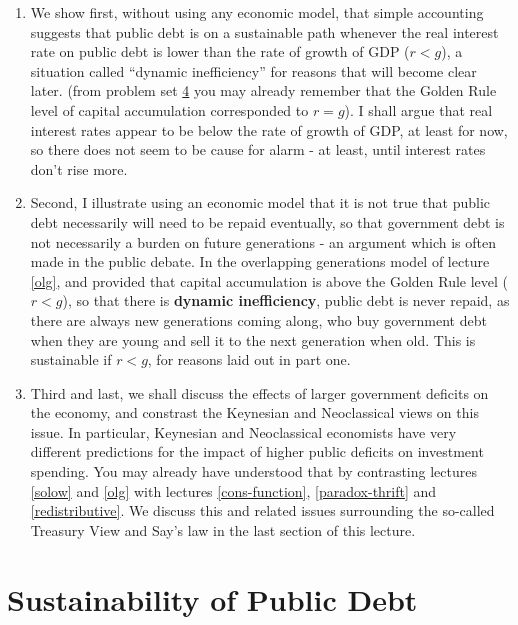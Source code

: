 \documentclass[]{book}
\theoremstyle{definition}
\theoremstyle{definition}
\theoremstyle{definition}
\theoremstyle{remark}
\begin{document}
\begin{enumerate}
\def\labelenumi{\arabic{enumi}.}
\item
  We show first, without using any economic model, that simple
  accounting suggests that public debt is on a sustainable path whenever
  the real interest rate on public debt is lower than the rate of growth
  of GDP (\(r<g\)), a situation called ``dynamic inefficiency'' for
  reasons that will become clear later. (from problem set
  \protect\hyperlink{pset4}{4} you may already remember that the Golden
  Rule level of capital accumulation corresponded to \(r=g\)). I shall
  argue that real interest rates appear to be below the rate of growth
  of GDP, at least for now, so there does not seem to be cause for alarm
  - at least, until interest rates don't rise more.
\item
  Second, I illustrate using an economic model that it is not true that
  public debt necessarily will need to be repaid eventually, so that
  government debt is not necessarily a burden on future generations - an
  argument which is often made in the public debate. In the overlapping
  generations model of lecture \ref{olg}, and provided that capital
  accumulation is above the Golden Rule level (\(r<g\)), so that there
  is \textbf{dynamic inefficiency}, public debt is never repaid, as
  there are always new generations coming along, who buy government debt
  when they are young and sell it to the next generation when old. This
  is sustainable if \(r<g\), for reasons laid out in part one.
\item
  Third and last, we shall discuss the effects of larger government
  deficits on the economy, and constrast the Keynesian and Neoclassical
  views on this issue. In particular, Keynesian and Neoclassical
  economists have very different predictions for the impact of higher
  public deficits on investment spending. You may already have
  understood that by contrasting lectures \ref{solow} and \ref{olg} with
  lectures \ref{cons-function}, \ref{paradox-thrift} and
  \ref{redistributive}. We discuss this and related issues surrounding
  the so-called Treasury View and Say's law in the last section of this
  lecture.
\end{enumerate}

\section{Sustainability of Public
Debt}\label{sustainability-of-public-debt}
\end{document}
